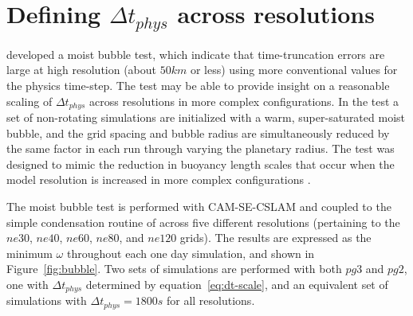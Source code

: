 \documentclass[draft,linenumbers]{agujournal}
\begin{document}



%
%
%
%
\appendix
\section{Defining $\Delta t_{phys}$ across resolutions}\label{sec:app1}
 \cite{HR2018JAMES} developed a moist bubble test, which indicate that time-truncation errors are large at high resolution (about $50km$ or less) using more conventional values for the physics time-step. The test may be able to provide insight on a reasonable scaling of $\Delta t_{phys}$ across resolutions in more complex configurations. In the test a set of non-rotating simulations are initialized with a warm, super-saturated moist bubble, and the grid spacing and bubble radius are simultaneously reduced by the same factor in each run through varying the planetary radius. The test was designed to mimic the reduction in buoyancy length scales that occur when the model resolution is increased in more complex configurations \citep{HETAL2006JCLIM,HR2018JAMES}. 
 
The moist bubble test is performed with CAM-SE-CSLAM and coupled to the simple condensation routine of \cite{K1969MM} across five different resolutions (pertaining to the $ne30$, $ne40$, $ne60$, $ne80$, and $ne120$ grids). The results are expressed as the minimum $\omega$ throughout each one day simulation, and shown in Figure~\ref{fig:bubble}. Two sets of simulations are performed with both $pg3$ and $pg2$, one with $\Delta t_{phys}$ determined by equation~\eqref{eq:dt-scale}, and an equivalent set of simulations with $\Delta t_{phys} = 1800s$ for all resolutions. 
\end{document}
